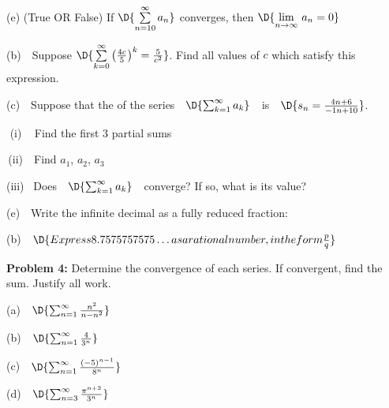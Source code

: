 \documentclass[12pt]{amsart}
\numberwithin{equation}{section}
\begin{document}
(e) (True OR False) \quad If $\D{\sum \limits_{n=10}^{\infty} a_n}$ converges, then $\D{\lim \limits_{n \to \infty}\, a_n = 0}$ 

(b) \,\, Suppose \quad $\D{\sum \limits_{k=0}^{\infty} \left(\frac{4c}{5}\right)^k = \frac{5}{c^2}}$. \quad Find all values of $c$ which satisfy this expression.

\vspace{6.1cm}

(c) \,\, Suppose that the  of the series \,\, $\D{\sum_{k=1}^\infty a_k}$ \,\, is \,\, $\D{s_n = \frac{4 n + 6}{-1 n + 10}}$.

\vspace{0.2cm}

\quad \,\,(i) \,\,\, Find the first 3 partial sums

\vspace{1.8cm}

\quad \,(ii) \,\, Find $a_1$, $a_2$, $a_3$

\vspace{2.6cm}

\quad (iii) \, Does \,\, $\D{\sum_{k=1}^\infty a_k }$ \,\, converge?  If so, what is its value?

\vspace{0.2cm}

(e) \,\, Write the infinite decimal as a fully reduced fraction: 

\vspace{0.2cm}

(b) \,\, $\D{Express 8.7575757575 \ldots as a rational number, in the form \frac{p}{q} }$


\thispagestyle{empty}
\newpage
\thispagestyle{empty}

{\bf Problem 4:} Determine the convergence of each series.  If convergent, find the sum.  Justify all work.

\vspace{0.1cm}

(a) \,\, $\D{\sum_{n=1}^\infty \frac{n^2}{n-n^2}}$

\vspace{2.0cm}

(b) \,\, $\D{\sum_{n=1}^\infty \frac{4}{3^n}}$

\vspace{2.0cm}

(c) \,\, $\D{\sum_{n=1}^\infty \frac{(- 5)^{n-1}}{8^n}}$

\vspace{2.0cm}

(d) \,\, $\D{\sum_{n=3}^\infty \frac{\pi^{n+2}}{3^n}}$
\end{document}
